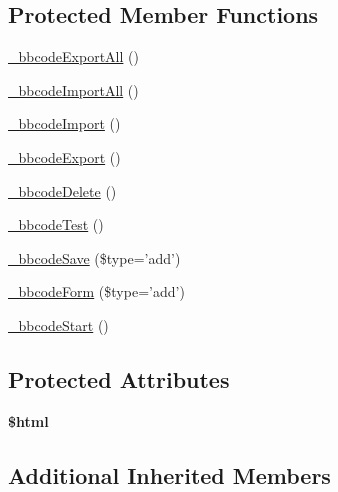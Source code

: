 \subsection*{Protected Member Functions}
\begin{DoxyCompactItemize}
\item 
\hyperlink{classadmin__core__posts__bbcode_a377377e14430a8bafd78fc7edc475ef2}{\-\_\-bbcode\-Export\-All} ()
\item 
\hyperlink{classadmin__core__posts__bbcode_a1a26fe522f089d6e312dfdadcc361425}{\-\_\-bbcode\-Import\-All} ()
\item 
\hyperlink{classadmin__core__posts__bbcode_ab57e2d42840d7e4cd028b3c8d3bbd078}{\-\_\-bbcode\-Import} ()
\item 
\hyperlink{classadmin__core__posts__bbcode_ae379a3c47a58c53e9e3c6fd8ede14b1c}{\-\_\-bbcode\-Export} ()
\item 
\hyperlink{classadmin__core__posts__bbcode_ae85592aac64d567a4cc25283561acddd}{\-\_\-bbcode\-Delete} ()
\item 
\hyperlink{classadmin__core__posts__bbcode_a8c8ab5861c50077303287bf4b0f7d2c3}{\-\_\-bbcode\-Test} ()
\item 
\hyperlink{classadmin__core__posts__bbcode_aa27b23de921b091feb3141e931c848f9}{\-\_\-bbcode\-Save} (\$type='add')
\item 
\hyperlink{classadmin__core__posts__bbcode_a38661072991d86323fe2bdfe471dfb40}{\-\_\-bbcode\-Form} (\$type='add')
\item 
\hyperlink{classadmin__core__posts__bbcode_a60aba6e9bbfa5751e6ecabf56e32503d}{\-\_\-bbcode\-Start} ()
\end{DoxyCompactItemize}
\subsection*{Protected Attributes}
\begin{DoxyCompactItemize}
\item 
\hypertarget{classadmin__core__posts__bbcode_a6f96e7fc92441776c9d1cd3386663b40}{{\bfseries \$html}}\label{classadmin__core__posts__bbcode_a6f96e7fc92441776c9d1cd3386663b40}

\end{DoxyCompactItemize}
\subsection*{Additional Inherited Members}



